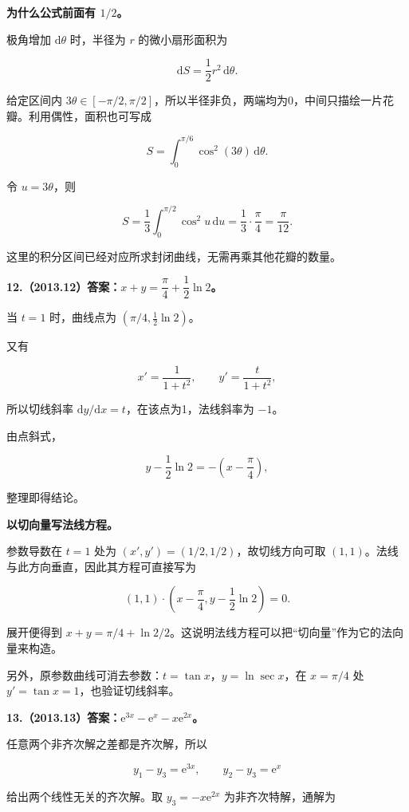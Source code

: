 \documentclass[UTF8,11pt,fontset=windows]{ctexart}
\begin{document}
\textbf{为什么公式前面有 $1/2$。}

极角增加 $\mathrm d\theta$ 时，半径为 $r$ 的微小扇形面积为

$$
\mathrm dS=\frac12r^2\,\mathrm d\theta.
$$

给定区间内 $3\theta\in[-\pi/2,\pi/2]$，所以半径非负，两端均为0，中间只描绘一片花瓣。利用偶性，面积也可写成

$$
S=\int_0^{\pi/6}\cos^2(3\theta)\,\mathrm d\theta.
$$

令 $u=3\theta$，则

$$
S=\frac13\int_0^{\pi/2}\cos^2u\,\mathrm du
=\frac13\cdot\frac\pi4=\frac\pi{12}.
$$

这里的积分区间已经对应所求封闭曲线，无需再乘其他花瓣的数量。

\clearpage

\textbf{12.（2013.12）答案：$x+y=\dfrac\pi4+\dfrac12\ln2$。}

当 $t=1$ 时，曲线点为 $(\pi/4,\frac12\ln2)$。

又有

$$
x'=\frac1{1+t^2},\qquad y'=\frac t{1+t^2},
$$

所以切线斜率 $\mathrm dy/\mathrm dx=t$，在该点为1，法线斜率为 $-1$。

由点斜式，

$$
y-\frac12\ln2=-\left(x-\frac\pi4\right),
$$

整理即得结论。

\textbf{以切向量写法线方程。}

参数导数在 $t=1$ 处为 $(x',y')=(1/2,1/2)$，故切线方向可取 $(1,1)$。法线与此方向垂直，因此其方程可直接写为

$$
(1,1)\cdot\left(x-\frac\pi4,y-\frac12\ln2\right)=0.
$$

展开便得到 $x+y=\pi/4+\ln2/2$。这说明法线方程可以把“切向量”作为它的法向量来构造。

另外，原参数曲线可消去参数：$t=\tan x$，$y=\ln\sec x$，在 $x=\pi/4$ 处 $y'=\tan x=1$，也验证切线斜率。

\clearpage

\textbf{13.（2013.13）答案：$\mathrm e^{3x}-\mathrm e^x-x\mathrm e^{2x}$。}

任意两个非齐次解之差都是齐次解，所以

$$
y_1-y_3=\mathrm e^{3x},\qquad y_2-y_3=\mathrm e^x
$$

给出两个线性无关的齐次解。取 $y_3=-x\mathrm e^{2x}$ 为非齐次特解，通解为
\end{document}
